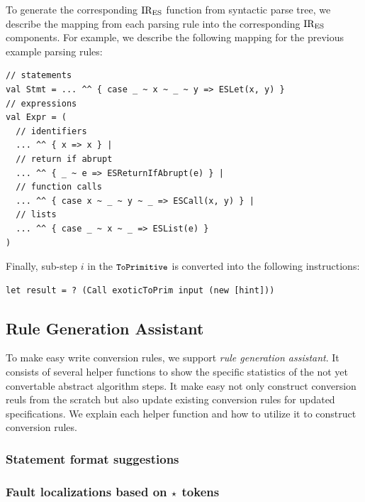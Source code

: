 To generate the corresponding \( \text{IR}_\text{ES} \) function from syntactic parse tree,
we describe the mapping from each parsing rule into the corresponding \( \text{IR}_\text{ES} \) components.
For example, we describe the following mapping for the previous example parsing rules:
\begin{lstlisting}[style=myScalastyle]
// statements
val Stmt = ... ^^ { case _ ~ x ~ _ ~ y => ESLet(x, y) }
// expressions
val Expr = (
  // identifiers
  ... ^^ { x => x } |
  // return if abrupt
  ... ^^ { _ ~ e => ESReturnIfAbrupt(e) } |
  // function calls
  ... ^^ { case x ~ _ ~ y ~ _ => ESCall(x, y) } |
  // lists
  ... ^^ { case _ ~ x ~ _ => ESList(e) }
)
\end{lstlisting}
Finally, sub-step \( i \) in the \( \texttt{\small ToPrimitive} \) is converted
into the following instructions:
\begin{lstlisting}[style=ires]
let result = ? (Call exoticToPrim input (new [hint]))
\end{lstlisting}

\subsection{Rule Generation Assistant}

To make easy write conversion rules, we support \textit{rule generation assistant}.
It consists of several helper functions to show the specific statistics of
the not yet convertable abstract algorithm steps. It make easy not only construct
conversion reuls from the scratch but also update existing conversion rules
for updated specifications. We explain each helper function and how to utilize
it to construct conversion rules.

\subsubsection{Statement format suggestions}


\subsubsection{Fault localizations based on \( \star \) tokens}

